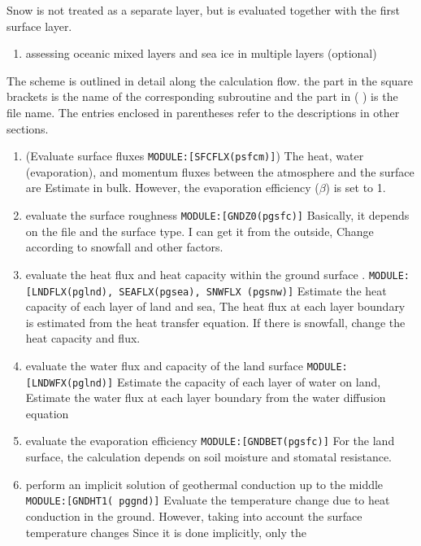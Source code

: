 Snow is not treated as a separate layer, but is evaluated together with
the first surface layer.

\begin{enumerate}
\def\labelenumi{\arabic{enumi}.}
\setcounter{enumi}{4}
\tightlist
\item
  assessing oceanic mixed layers and sea ice in multiple layers
  (optional)
\end{enumerate}

The scheme is outlined in detail along the calculation flow. \where the
part in the square brackets is the name of the corresponding subroutine
and the part in ( ) is the file name. The entries enclosed in
parentheses refer to the descriptions in other sections.

\begin{enumerate}
\def\labelenumi{\arabic{enumi}.}
\item
  (Evaluate surface fluxes \texttt{MODULE:{[}SFCFLX(psfcm){]}}) The
  heat, water (evaporation), and momentum fluxes between the atmosphere
  and the surface are Estimate in bulk. However, the evaporation
  efficiency (\(\beta\)) is set to 1.
\item
  evaluate the surface roughness \texttt{MODULE:{[}GNDZ0(pgsfc){]}}
  Basically, it depends on the file and the surface type. I can get it
  from the outside, Change according to snowfall and other factors.
\item
  evaluate the heat flux and heat capacity within the ground surface .
  \texttt{MODULE:{[}LNDFLX(pglnd),\ SEAFLX(pgsea),\ SNWFLX\ (pgsnw){]}}
  Estimate the heat capacity of each layer of land and sea, The heat
  flux at each layer boundary is estimated from the heat transfer
  equation. If there is snowfall, change the heat capacity and flux.
\item
  evaluate the water flux and capacity of the land surface
  \texttt{MODULE:{[}LNDWFX(pglnd){]}} Estimate the capacity of each
  layer of water on land, Estimate the water flux at each layer boundary
  from the water diffusion equation
\item
  evaluate the evaporation efficiency
  \texttt{MODULE:{[}GNDBET(pgsfc){]}} For the land surface, the
  calculation depends on soil moisture and stomatal resistance.
\item
  perform an implicit solution of geothermal conduction up to the middle
  \texttt{MODULE:{[}GNDHT1(\ pggnd){]}} Evaluate the temperature change
  due to heat conduction in the ground. However, taking into account the
  surface temperature changes Since it is done implicitly, only the

\end{enumerate}
